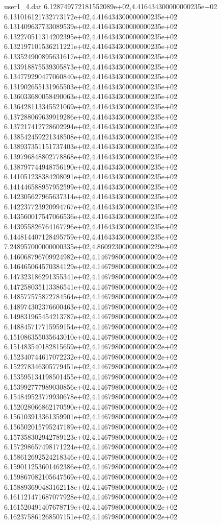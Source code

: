 \begin{filecontents}{user1_4.dat}
6.128749772181552089e+02,4.416434300000000235e+02
6.131016121732773172e+02,4.416434300000000235e+02
6.131409637733089539e+02,4.416434300000000235e+02
6.132270511314202395e+02,4.416434300000000235e+02
6.132197101536211221e+02,4.416434300000000235e+02
6.133524900895631617e+02,4.416434300000000235e+02
6.133918875539305873e+02,4.416434300000000235e+02
6.134779290477060840e+02,4.416434300000000235e+02
6.131902655131965503e+02,4.416434300000000235e+02
6.136033680058490063e+02,4.416434300000000235e+02
6.136428113345521069e+02,4.416434300000000235e+02
6.137288069639919286e+02,4.416434300000000235e+02
6.137217412728602994e+02,4.416434300000000235e+02
6.138542459221348508e+02,4.416434300000000235e+02
6.138937351151737403e+02,4.416434300000000235e+02
6.139796848802778868e+02,4.416434300000000235e+02
6.138797744948756190e+02,4.416434300000000235e+02
6.141051238384208091e+02,4.416434300000000235e+02
6.141446588957952599e+02,4.416434300000000235e+02
6.142305627965637314e+02,4.416434300000000235e+02
6.142237723920994767e+02,4.416434300000000235e+02
6.143560017547066536e+02,4.416434300000000235e+02
6.143955826764167796e+02,4.416434300000000235e+02
6.144814407128495759e+02,4.416434300000000235e+02
7.248957000000000335e+02,4.860923000000000229e+02
6.146068796709924982e+02,4.146798000000000002e+02
6.146465064570384129e+02,4.146798000000000002e+02
6.147323186291355341e+02,4.146798000000000002e+02
6.147258035113386541e+02,4.146798000000000002e+02
6.148577575872784564e+02,4.146798000000000002e+02
6.148974302376600463e+02,4.146798000000000002e+02
6.149831965454213787e+02,4.146798000000000002e+02
6.148845717715959154e+02,4.146798000000000002e+02
6.151086355035643010e+02,4.146798000000000002e+02
6.151483540182815659e+02,4.146798000000000002e+02
6.152340744617072232e+02,4.146798000000000002e+02
6.152278346305779451e+02,4.146798000000000002e+02
6.153595134198501455e+02,4.146798000000000002e+02
6.153992777989030856e+02,4.146798000000000002e+02
6.154849523779930678e+02,4.146798000000000002e+02
6.152028066862170590e+02,4.146798000000000002e+02
6.156103913361359901e+02,4.146798000000000002e+02
6.156502015795247189e+02,4.146798000000000002e+02
6.157358302942789123e+02,4.146798000000000002e+02
6.157298657498171224e+02,4.146798000000000002e+02
6.158612692524218346e+02,4.146798000000000002e+02
6.159011253601462386e+02,4.146798000000000002e+02
6.159867082105647569e+02,4.146798000000000002e+02
6.158893690483162118e+02,4.146798000000000002e+02
6.161121471687077928e+02,4.146798000000000002e+02
6.161520491407678719e+02,4.146798000000000002e+02
6.162375861268507151e+02,4.146798000000000002e+02

\end{filecontents}
